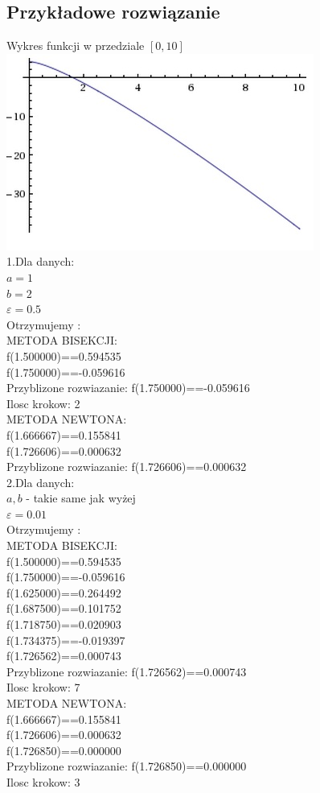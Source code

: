 \documentclass[11pt]{article} %
\begin{document}
\subsection {Przykładowe rozwiązanie}
Wykres funkcji w przedziale $[0,10]$\\
\includegraphics {Funkcja.jpg}\\
1.Dla danych:\\
$a=1$\\
$b=2$\\
$\varepsilon = 0.5$\\
Otrzymujemy :\\
METODA BISEKCJI:\\
f(1.500000)==0.594535\\
f(1.750000)==-0.059616\\
Przyblizone rozwiazanie: f(1.750000)==-0.059616\\
Ilosc krokow: 2\\
METODA NEWTONA:\\
f(1.666667)==0.155841\\
f(1.726606)==0.000632\\
Przyblizone rozwiazanie: f(1.726606)==0.000632\\
2.Dla danych:\\
$a,b$ - takie same jak wyżej \\
$\varepsilon = 0.01$\\
Otrzymujemy :\\
METODA BISEKCJI:\\
f(1.500000)==0.594535\\
f(1.750000)==-0.059616\\
f(1.625000)==0.264492\\
f(1.687500)==0.101752\\
f(1.718750)==0.020903\\
f(1.734375)==-0.019397\\
f(1.726562)==0.000743\\
Przyblizone rozwiazanie: f(1.726562)==0.000743\\
Ilosc krokow: 7\\
METODA NEWTONA:\\
f(1.666667)==0.155841\\
f(1.726606)==0.000632\\
f(1.726850)==0.000000\\
Przyblizone rozwiazanie: f(1.726850)==0.000000\\
Ilosc krokow: 3
\end{document}
